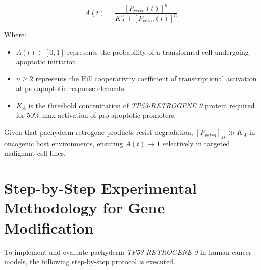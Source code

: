 \documentclass[12pt]{article}
\begin{document}
\begin{equation}
A(t) = \frac{[P_{retro}(t)]^n}{K_A^n + [P_{retro}(t)]^n}
\end{equation}

Where:
\begin{itemize}
    \item $A(t) \in [0, 1]$ represents the probability of a transformed cell undergoing apoptotic initiation.
    \item $n \ge 2$ represents the Hill cooperativity coefficient of transcriptional activation at pro-apoptotic response elements.
    \item $K_A$ is the threshold concentration of \textit{TP53-RETROGENE 9} protein required for 50\% max activation of pro-apoptotic promoters.
\end{itemize}

Given that pachyderm retrogene products resist degradation, $[P_{retro}]_{ss} \gg K_A$ in oncogenic host environments, ensuring $A(t) \to 1$ selectively in targeted malignant cell lines.

\section{Step-by-Step Experimental Methodology for Gene Modification}

To implement and evaluate pachyderm \textit{TP53-RETROGENE 9} in human cancer models, the following step-by-step protocol is executed.
\end{document}
